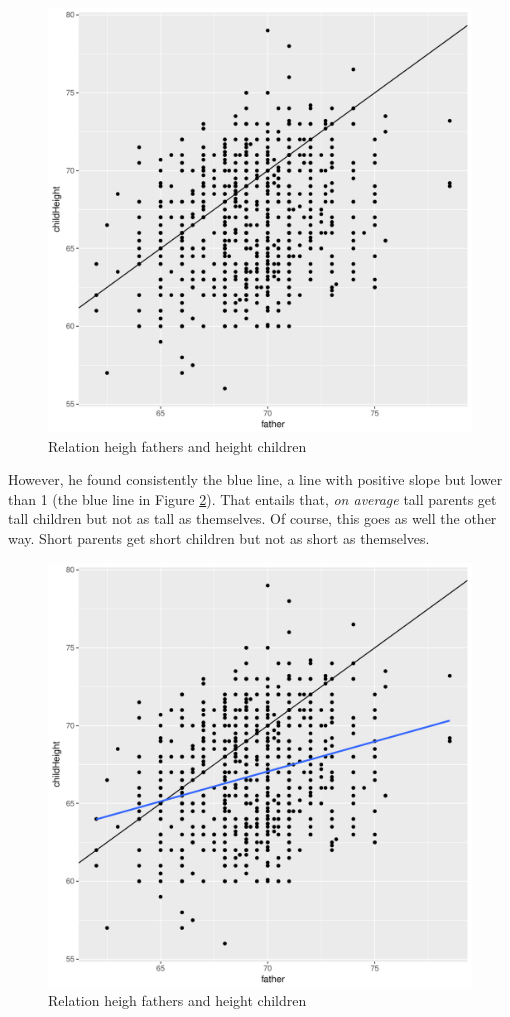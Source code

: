 \documentclass[
]{book}
\begin{document}
\begin{figure}
\includegraphics[width=7in]{./figures/Galton2} \caption{Relation heigh fathers and height children}\label{fig:galton2}
\end{figure}

However, he found consistently the blue line, a line with positive slope but lower than 1 (the blue line in Figure \ref{fig:galton1}). That entails that, \emph{on average} tall parents get tall children but not as tall as themselves. Of course, this goes as well the other way. Short parents get short children but not as short as themselves.

\begin{figure}
\includegraphics[width=7in]{./figures/Galton1} \caption{Relation heigh fathers and height children}\label{fig:galton1}
\end{figure}
\end{document}
